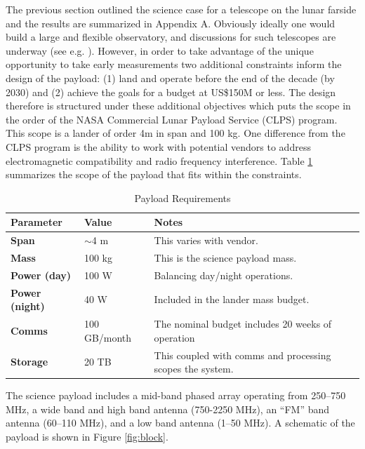 The previous section outlined the science case for a telescope on the lunar farside and the results are summarized in Appendix A.  Obviously ideally one would build a large and flexible observatory, and discussions for such telescopes are underway (see e.g. ).  However, in order to take advantage of the unique opportunity to take early measurements two additional constraints inform the design of the payload: (1) land and operate before the end of the decade (by 2030) and (2) achieve the goals for a budget at US\$150M or less.  The design therefore is structured under these additional objectives which puts the scope in the order of the NASA Commercial Lunar Payload Service (CLPS) program.  This scope is a lander of order 4m in span and 100 kg.  One difference from the CLPS program is the ability to work with potential vendors to address electromagnetic compatibility and radio frequency interference.  Table \ref{tab:constraints} summarizes the scope of the payload that fits within the constraints.

\begin{table}
    \caption{Payload Requirements}
    \begin{tabular}{|l|l|l|} \hline
    \textbf{Parameter} & \textbf{Value} & \textbf{Notes} \\ \hline
    \textbf{Span} & $\sim$4 m & This varies with vendor. \\ \hline
    \textbf{Mass} & 100 kg & This is the science payload mass. \\ \hline
    \textbf{Power (day)} & 100 W & Balancing day/night operations. \\ \hline
    \textbf{Power (night)} & 40 W & Included in the lander mass budget. \\ \hline
    \textbf{Comms} & 100 GB/month & The nominal budget includes 20 weeks of operation \\ \hline
    \textbf{Storage} & 20 TB & This coupled with comms and processing scopes the system. \\ \hline
    \end{tabular}
    \label{tab:constraints}
\end{table}

The science payload includes a mid-band phased array operating from 250--750 MHz, a wide band and high band antenna (750-2250 MHz), an ``FM'' band antenna (60--110 MHz), and a low band antenna (1--50 MHz). A schematic of the payload is shown in Figure \ref{fig:block}.

